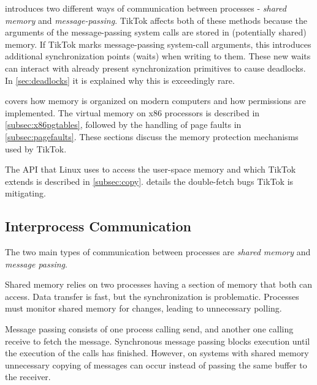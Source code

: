 
 introduces two different ways of communication between
processes - \emph{shared memory} and \emph{message-passing}. TikTok affects both
of these methods because the arguments of the message-passing system calls are
stored in (potentially shared) memory. If TikTok marks message-passing
system-call arguments, this introduces additional synchronization points (waits)
when writing to them. These new waits can interact with already present
synchronization primitives to cause deadlocks. In \cref{sec:deadlocks} it is
explained why this is exceedingly rare.

 covers how memory is organized on modern computers and how
permissions are implemented. The virtual memory on x86 processors is described
in \cref{subsec:x86pgtables}, followed by the handling of page faults in
\cref{subsec:pagefaults}. These sections discuss the memory protection
mechanisms used by TikTok.

The API that Linux uses to access the user-space memory and which TikTok extends is
described in \cref{subsec:copy}.  details the
double-fetch bugs TikTok is mitigating.

\subsection{Interprocess Communication}
\label{subsec:ipc}

The two main types of communication between processes are \emph{shared memory} 
and \emph{message passing}\cite{silberschatz2018operating}.

Shared memory relies on two processes having a section of memory that both can 
access. Data transfer is fast, but the synchronization is problematic. 
Processes must monitor shared memory for changes, leading to unnecessary
polling.

Message passing consists of one process calling send, and another one calling
receive to fetch the message. Synchronous message passing blocks execution until
the execution of the calls has finished. However, on systems with shared memory
unnecessary copying of messages can occur instead of passing the same buffer to
the receiver.

